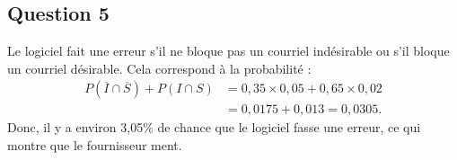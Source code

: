 \documentclass[10pt]{article}
\begin{document}
\subsection*{Question 5}

Le logiciel fait une erreur s'il ne bloque pas un courriel indésirable ou s'il bloque un courriel désirable. Cela correspond à la probabilité :
\begin{align*}
	P(\overline{I} \cap \overline{S}) + P(I \cap S) &= 0,35 \times 0,05 + 0,65 \times 0,02 \\
	&= 0,0175 + 0,013 = 0,0305.
\end{align*}
Donc, il y a environ 3,05\% de chance que le logiciel fasse une erreur, ce qui montre que le fournisseur ment.
\end{document}
